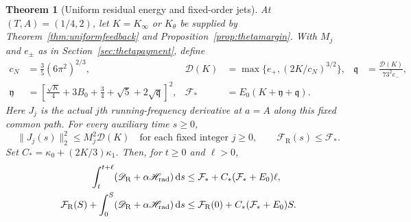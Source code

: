 \documentclass[11pt]{article}
\numberwithin{equation}{section}
\newtheorem{theorem}{Theorem}[section]
\newcommand{\dd}{\,\mathrm d}
\begin{document}
\begin{theorem}[Uniform residual energy and fixed-order jets]
\label{thm:uniformresidual}
At $(T,A)=(1/4,2)$, let $K=K_\infty$ or $K_\theta$ be supplied by
Theorem~\ref{thm:uniformfeedback} and
Proposition~\ref{prop:thetamargin}. With $M_j$ and $e_\pm$ as in
Section~\ref{sec:thetapayment}, define
\begin{align}
 c_N&=\frac35(6\pi^2)^{2/3},&
 \mathcal D(K)&=\max\{e_+,(2K/c_N)^{3/2}\},&
 \mathfrak q&=\frac{\mathcal D(K)}{73^2e_-},\nonumber\\
 \mathfrak y&=\left[\frac{\sqrt K}{4}+3B_0+\frac34+\sqrt5
                         +2\sqrt{\mathfrak q}\right]^2,&
 \mathcal F_*&=E_0(K+\mathfrak y+\mathfrak q).
 \label{eq:uniformresidualconstant}
\end{align}
Here $J_j$ is the actual $j$th running-frequency derivative at $a=A$
along this fixed common path. For every auxiliary time $s\ge0$,
\begin{equation}\label{eq:fixedjetuniform}
 \|J_j(s)\|_2^2\le M_j^2\mathcal D(K)\quad
 \text{for each fixed integer }j\ge0,\qquad
 \mathcal F_{\mathrm R}(s)\le\mathcal F_*.
\end{equation}
Set $C_*=\kappa_0+(2K/3)\kappa_1$. Then, for $t\ge0$ and $\ell>0$,
\begin{align}
 \int_t^{t+\ell}(\mathscr D_{\mathrm R}
                    +\alpha\mathscr H_{\rm rad})\dd s
 &\le\mathcal F_*+C_*(\mathcal F_*+E_0)\ell,
 \label{eq:uniformresidualwindows}\\
 \mathcal F_{\mathrm R}(S)+\int_0^S(\mathscr D_{\mathrm R}
                    +\alpha\mathscr H_{\rm rad})\dd s
 &\le\mathcal F_{\mathrm R}(0)+C_*(\mathcal F_*+E_0)S.
 \label{eq:uniformresidualcumulative}
\end{align}
\end{theorem}
\end{document}
